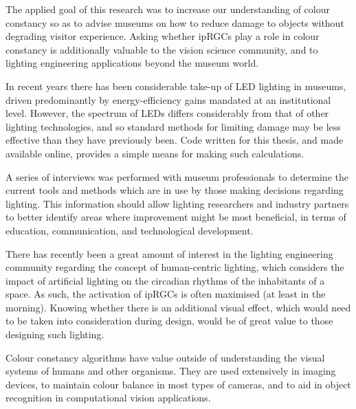 \begin{impactstatement}

The applied goal of this research was to increase our understanding of colour constancy so as to advise museums on how to reduce damage to objects without degrading visitor experience. Asking whether ipRGCs play a role in colour constancy is additionally valuable to the vision science community, and to lighting engineering applications beyond the museum world.

In recent years there has been considerable take-up of LED lighting in museums, driven predominantly by energy-efficiency gains mandated at an institutional level. However, the spectrum of LEDs differs considerably from that of other lighting technologies, and so standard methods for limiting damage may be less effective than they have previously been. Code written for this thesis, and made available online, provides a simple means for making such calculations. 

A series of interviews was performed with museum professionals to determine the current tools and methods which are in use by those making decisions regarding lighting. This information should allow lighting researchers and industry partners to better identify areas where improvement might be most beneficial, in terms of education, communication, and technological development.

There has recently been a great amount of interest in the lighting engineering community regarding the concept of human-centric lighting, which considers the impact of artificial lighting on the circadian rhythms of the inhabitants of a space. As such, the activation of ipRGCs is often maximised (at least in the morning). Knowing whether there is an additional visual effect, which would need to be taken into consideration during design, would be of great value to those designing such lighting.

Colour constancy algorithms have value outside of understanding the visual systems of humans and other organisms. They are used extensively in imaging devices, to maintain colour balance in most types of cameras, and to aid in object recognition in computational vision applications.








\end{impactstatement}
